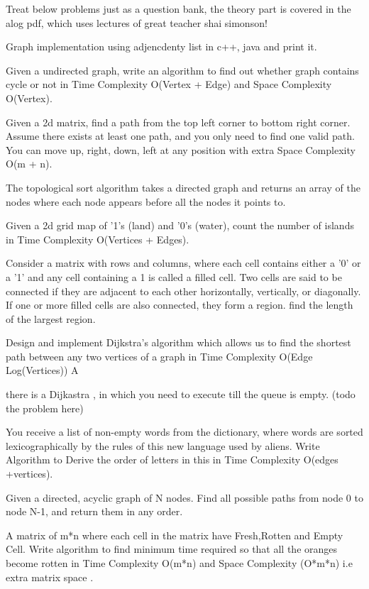 {\begin{exercise}
\begin{compactenum}
    \item Treat below problems just as a question bank, the theory part is covered in the alog pdf, which uses lectures of great teacher shai simonson!
    \item Graph implementation using adjencdenty list in c++, java and print it.
    \item Given a undirected graph, write an algorithm to find out whether graph contains cycle or not in Time Complexity O(Vertex + Edge) and Space Complexity O(Vertex).
    \item Given a 2d matrix, find a path from the top left corner to bottom right corner. Assume there exists at least one path, and you only need to find one valid path. You can move up, right, down, left at any position with extra Space Complexity O(m + n).
    \item The topological sort algorithm takes a directed graph and returns an array of the nodes where each node appears before all the nodes it points to.
    \item Given a 2d grid map of '1's (land) and '0's (water), count the number of islands in Time Complexity O(Vertices + Edges).
    \item Consider a matrix with rows and columns, where each cell contains either a '0' or a '1' and any cell containing a 1 is called a filled cell. Two cells are said to be connected if they are adjacent to each other horizontally, vertically, or diagonally. If one or more filled cells are also connected, they form a region. find the length of the largest region.
    \item Design and implement Dijkstra's algorithm which allows us to find the shortest path between any two vertices of a graph in Time Complexity O(Edge Log(Vertices)) A
    \item there is a Dijkastra , in which you need to execute till the queue is empty. (todo the problem here)
    \item You receive a list of non-empty words from the dictionary, where words are sorted lexicographically by the rules of this new language used by aliens. Write Algorithm to Derive the order of letters in this in Time Complexity O(edges +vertices).
    \item Given a directed, acyclic graph of N nodes.  Find all possible paths from node 0 to node N-1, and return them in any order.
    \item A matrix of m*n where each cell in the matrix have Fresh,Rotten and Empty Cell. Write algorithm to find minimum time required so that all the oranges become rotten in Time Complexity O(m*n) and Space Complexity (O*m*n) i.e extra matrix space .

\end{compactenum}
\end{exercise}}
